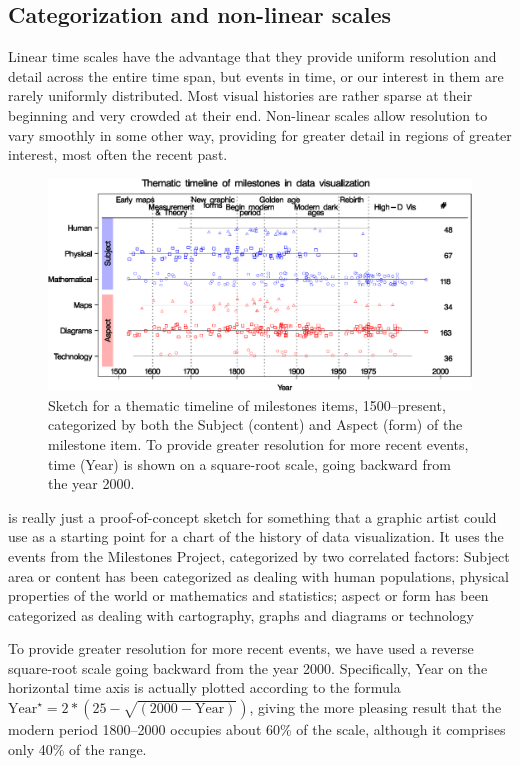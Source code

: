 \subsection{Categorization and non-linear scales}

Linear time scales have the advantage that they
provide uniform resolution and detail across the entire time span, but events in time, or our interest in them are rarely uniformly distributed. Most visual histories are rather sparse at their beginning and very
crowded at their end.
Non-linear scales allow resolution to vary smoothly in some other way, providing for greater detail
in regions of greater interest, most often the recent past.


\begin{figure}[!htb]
  \centering
  \includegraphics[width=\textwidth,clip]{fig/milecatline}
  \caption{Sketch for a thematic timeline of milestones items, 1500--present,
  categorized by both the Subject (content)
  and Aspect (form) of the milestone item.  To provide greater resolution for more recent events,
  time (Year) is shown on a square-root scale, going backward from the year 2000.
  }
  \label{fig:milecatline}
\end{figure}

 is really just a proof-of-concept sketch for something that a graphic artist
could use as a starting point for a chart of
the history of data visualization. It uses the events from the
Milestones Project, categorized by two correlated factors: 
Subject area or content has been
categorized as dealing with human populations, physical properties of the world or
mathematics and statistics; aspect or form has been categorized as dealing with
cartography, graphs and diagrams or technology 

To provide greater resolution for more recent events, we have used a reverse square-root
scale going backward from the year 2000. Specifically, Year on the horizontal time axis
is actually plotted according to the formula $\textrm{Year}^\star = 2* (25 - \sqrt{(2000 - \textrm{Year})})$,
giving the more pleasing result that the modern period 1800--2000 occupies about 60\% of the scale,
although it comprises only 40\% of the range.

